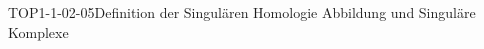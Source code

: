 
\begin{DEF}{TOP1-1-02-05}{Definition der Singulären Homologie Abbildung und Singuläre Komplexe}
\end{DEF}
